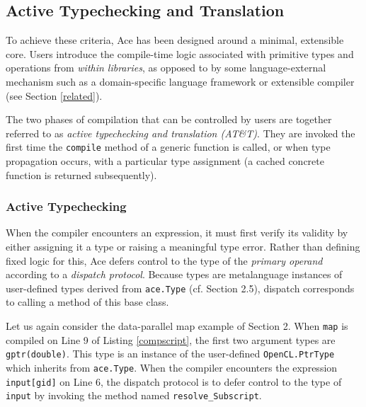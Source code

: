 \documentclass[9pt,preprint]{sigplanconf}
\begin{document}
\subsection{Active Typechecking and Translation}
To achieve these criteria, Ace has been designed around a minimal, {extensible} core. Users introduce the compile-time logic associated with primitive types and operations from \emph{within libraries}, as opposed to by some language-external mechanism such as a domain-specific language framework or extensible compiler (see Section \ref{related}). 

The two phases of compilation that can be controlled by users are together referred to as \emph{active typechecking and translation (AT\&T)}. They are invoked the first time the \verb|compile| method of a generic function is called, or when type propagation occurs, with a particular type assignment (a cached concrete function is returned subsequently).

\subsubsection{Active Typechecking}

When the compiler encounters an expression, it must first verify its validity by either assigning it a type or raising a meaningful type error. Rather than defining fixed logic for this, Ace defers control to the {type} of the \emph{primary operand} according to a {\em dispatch protocol}. Because types are metalanguage instances of user-defined types derived from \verb|ace.Type| (cf. Section 2.5), dispatch corresponds to calling a method of this base class.

Let us again consider the data-parallel map example of Section 2. When \verb|map| is compiled on Line 9 of Listing \ref{compscript}, the first two argument types are \verb|gptr(double)|. This type is an instance of the user-defined \verb|OpenCL.PtrType| which inherits from \verb|ace.Type|. When the compiler encounters the expression \verb|input[gid]| on Line 6, the dispatch protocol is to defer control to the type of \verb|input| by invoking the method named \verb|resolve_Subscript|.
\end{document}
